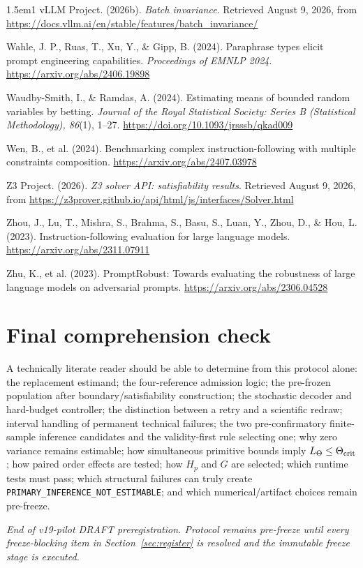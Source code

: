 \documentclass[11pt,a4paper]{article}
\newcommand{\INFERNE}{\texttt{PRIMARY\_INFERENCE\_NOT\_\allowbreak ESTIMABLE}}
\begin{document}
\begin{hangparas}{1.5em}{1}
vLLM Project. (2026b). \textit{Batch invariance}. Retrieved August 9, 2026, from \url{https://docs.vllm.ai/en/stable/features/batch_invariance/}

Wahle, J. P., Ruas, T., Xu, Y., \& Gipp, B. (2024). Paraphrase types elicit prompt engineering capabilities. \textit{Proceedings of EMNLP 2024}. \url{https://arxiv.org/abs/2406.19898}

Waudby-Smith, I., \& Ramdas, A. (2024). Estimating means of bounded random variables by betting. \textit{Journal of the Royal Statistical Society: Series B (Statistical Methodology), 86}(1), 1--27. \url{https://doi.org/10.1093/jrsssb/qkad009}

Wen, B., et al. (2024). Benchmarking complex instruction-following with multiple constraints composition. \url{https://arxiv.org/abs/2407.03978}

Z3 Project. (2026). \textit{Z3 solver API: satisfiability results}. Retrieved August 9, 2026, from \url{https://z3prover.github.io/api/html/js/interfaces/Solver.html}

Zhou, J., Lu, T., Mishra, S., Brahma, S., Basu, S., Luan, Y., Zhou, D., \& Hou, L. (2023). Instruction-following evaluation for large language models. \url{https://arxiv.org/abs/2311.07911}

Zhu, K., et al. (2023). PromptRobust: Towards evaluating the robustness of large language models on adversarial prompts. \url{https://arxiv.org/abs/2306.04528}
\end{hangparas}

\clearpage\section*{Final comprehension check}
A technically literate reader should be able to determine from this protocol alone: the replacement estimand; the four-reference admission logic; the pre-frozen population after boundary/satisfiability construction; the stochastic decoder and hard-budget controller; the distinction between a retry and a scientific redraw; interval handling of permanent technical failures; the two pre-confirmatory finite-sample inference candidates and the validity-first rule selecting one; why zero variance remains estimable; how simultaneous primitive bounds imply $L_\Theta\le\Theta_{\rm crit}$; how paired order effects are tested; how $H_p$ and $G$ are selected; which runtime tests must pass; which structural failures can truly create \INFERNE{}; and which numerical/artifact choices remain pre-freeze.

\vfill
\begin{center}
\textit{End of v19-pilot DRAFT preregistration. Protocol remains pre-freeze until every freeze-blocking item in Section~\ref{sec:register} is resolved and the immutable freeze stage is executed.}
\end{center}
\end{document}
